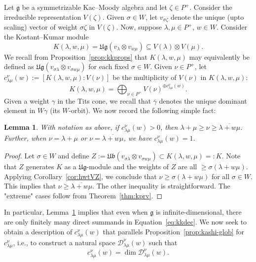 \documentclass[12pt,reqno]{amsart}
\theoremstyle{plain}
\newtheorem{lemma}[theorem]{Lemma}
\theoremstyle{definition}
\theoremstyle{remark}
\theoremstyle{plain}
\newcommand{\mcdw}{\mathcal{D}_{\!\lambda\mu}^{\nu}(w)}
\newcommand{\lie}{\mathfrak}
\newcommand{\lrw}{c_{\lambda\mu}^\nu(w)}
\newcommand{\lr}{c_{\lambda\mu}^\nu}
\begin{document}
\subsection{}
 Let $\mathfrak{g}$ be a symmetrizable Kac--Moody algebra and let $\zeta \in P^+$. Consider the irreducible representation $V(\zeta)$. Given $\sigma \in W$, let $v_{\sigma \zeta}$ denote the unique (upto scaling) vector of weight $\sigma\zeta$ in $V(\zeta)$. 
Now, suppose $\lambda, \mu \in P^+$, $w \in W$. Consider the Kostant--Kumar module \[K(\lambda, w, \mu)= \mathfrak{Ug}(v_\lambda\otimes v_{w\mu}) \subseteq V(\lambda) \otimes V(\mu).\] 
We recall from Proposition~\ref{prop:kkprops} that $K(\lambda,w,\mu)$ may equivalently be defined as $\mathfrak{Ug}(v_{\sigma\lambda} \otimes v_{\sigma w\mu})$ for each fixed $\sigma \in W$. 
%
Given $\nu \in P^+$, let $\lrw :=[K(\lambda,w,\mu): V(\nu)]$ be the multiplicity of $V(\nu)$ in $K(\lambda, w, \mu)$:
 \begin{equation}\label{eq:kkdec}
      K(\lambda,w,\mu) = \bigoplus_{\nu \in P^+} V(\nu)^{\oplus \lrw}.
 \end{equation}
Given a weight $\gamma$ in the Tits cone, we recall that $\overline{\gamma}$ denotes the unique dominant element in $W\gamma$ (its $W$-orbit). We now record the following simple fact:
\begin{lemma}\label{lem:supplrw}
With notation as above, if $\lrw >0$, then $\lambda+\mu \geq \nu \geq \overline{\lambda+w\mu}$. Further, when $\nu = \lambda+\mu$ or $\nu = \overline{\lambda+w\mu}$, we have $\lrw = 1$.
\end{lemma}
\begin{proof}
Let $\sigma \in W$ and define $Z:= \lie{Ub}(v_{\sigma\lambda} \otimes v_{\sigma w\mu}) \subset K(\lambda,w,\mu)=:K$. Note that $Z$ generates $K$ as a $\lie{Ug}$-module  and the weights of $Z$ are all $\geq \sigma(\lambda + w\mu)$. Applying Corollary~\ref{cor:hwtVZ}, we conclude that $\nu \geq \sigma(\lambda + w\mu)$ for all $\sigma \in W$. This implies that $\nu \geq \overline{\lambda+w\mu}$. The other inequality is straightforward. The "extreme" cases follow from Theorem~\ref{thm:kprv}.
\end{proof}
In particular, Lemma~\ref{lem:supplrw} implies that even when $\lie g$ is infinite-dimensional, there are only finitely many direct summands in Equation~\eqref{eq:kkdec}.
%
We now seek to obtain a description of $\lrw$ that parallels Proposition~\ref{prop:kashi-glob} for $\lr$, i.e., to construct a natural space $\mcdw$ such that \[\lrw = \dim \mcdw.\]
\end{document}
